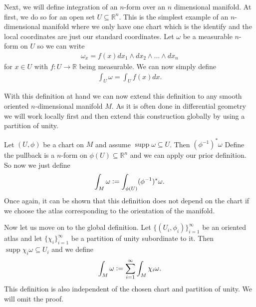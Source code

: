 \documentclass[12pt,a4paper]{article}
\numberwithin{equation}{subsection}
\numberwithin{lemma}{subsection}
\theoremstyle{definition}
\DeclareMathOperator{\supp}{supp}
\newcommand{\real}{\mathbb{R}}
\begin{document}
Next, we will define integration of an $n$-form over an $n$ dimensional 
manifold. At first, we do so for an open set $U \subseteq \real^n$.
This is the simplest example of an $n$-dimensional manifold where 
we only have one chart which is the identify and the local coordinates are 
just our standard coordinates. Let $\omega$ be a measurable 
$n$-form on $U$ so we can 
write 
\begin{align*}
    \omega_x = f(x) dx_1 \wedge dx_2 \wedge ... \wedge dx_n
\end{align*}
for $x \in U$ with $f:U \rightarrow \real$ being measurable. 
We can now simply define 
\begin{align*}
    \int_U \omega = \int_U f(x) dx.
\end{align*}

With this definition at hand we can now extend this definition to 
any smooth oriented $n$-dimensional manifold $M$. As it is often done in 
differential geometry we will work locally first and then extend this 
construction globally by using a partition of unity.

Let $(U,\phi)$ be a chart on $M$ and assume $\supp \omega \subseteq U$. 
Then $(\phi^{-1})^* \omega$ {\color{red} Define the pullback}
is a $n$-form on $\phi(U) \subseteq \real^n$ and 
we can apply our prior definition. So now we just define 
\begin{align*}
    \int_M \omega \vcentcolon= \int_{\phi(U)} (\phi^{-1})^* \omega.
\end{align*}
Once again, it can be shown that this definition does not depend on the chart if 
we choose the atlas corresponding to the orientation of the manifold. 

Now let us move on to the global definition. Let $\{(U_i,\phi_i)\}_{i=1}^\infty$
be an oriented atlas and let $\{ \chi_i \}_{i=1}^\infty$ be a partition 
of unity subordinate to it. 
Then $\supp \chi_i \omega \subseteq U_i$ 
and we define 
\begin{align*}
    \int_M \omega \vcentcolon= \sum_{i=1}^\infty \int_M \chi_i \omega.
\end{align*} 
This definition is also independent of the chosen chart and partition of 
unity. We will omit the proof. 
\end{document}
